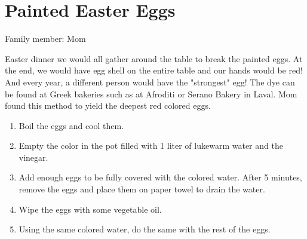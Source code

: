 \chapter{Painted Easter Eggs}
\label{ch:eastereggs}


Family member: Mom


 Easter dinner we would all gather around the table to break the painted eggs. At the end, we would have egg shell on the entire table and our hands would be red! And every year, a different person would have the "strongest" egg!     The dye can be found at Greek bakeries such as at Afroditi or Serano Bakery in Laval. Mom found this method to yield the deepest red colored eggs.

\begin{enumerate}
    \item Boil the eggs and cool them.
    \item Empty the color in the pot filled with 1 liter of lukewarm water and the vinegar.
    \item Add enough eggs to be fully covered with the colored water. After 5 minutes, remove the eggs and place them on paper towel to drain the water.
    \item Wipe the eggs with some vegetable oil.
    \item Using the same colored water, do the same with the rest of the eggs. 
\end{enumerate}


